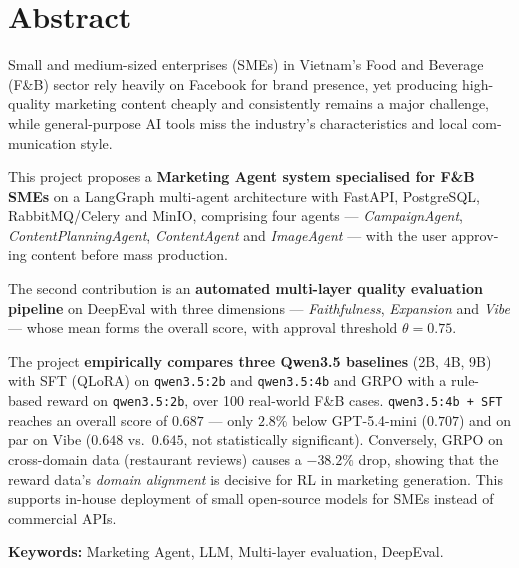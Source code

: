\cleardoublepage
{}
{}
\chapter*{Abstract}

\begin{otherlanguage}{english}

Small and medium-sized enterprises (SMEs) in Vietnam's Food and Beverage (F\&B) sector rely heavily on Facebook for brand presence, yet producing high-quality marketing content cheaply and consistently remains a major challenge, while general-purpose AI tools miss the industry's characteristics and local communication style.

This project proposes a \textbf{Marketing Agent system specialised for F\&B SMEs} on a LangGraph multi-agent architecture with FastAPI, PostgreSQL, RabbitMQ/Celery and MinIO, comprising four agents --- \textit{CampaignAgent}, \textit{ContentPlanningAgent}, \textit{ContentAgent} and \textit{ImageAgent} --- with the user approving content before mass production.

The second contribution is an \textbf{automated multi-layer quality evaluation pipeline} on DeepEval with three dimensions --- \textit{Faithfulness}, \textit{Expansion} and \textit{Vibe} --- whose mean forms the overall score, with approval threshold $\theta = 0.75$.

The project \textbf{empirically compares three Qwen3.5 baselines} (2B, 4B, 9B) with SFT (QLoRA) on \texttt{qwen3.5:2b} and \texttt{qwen3.5:4b} and GRPO with a rule-based reward on \texttt{qwen3.5:2b}, over 100 real-world F\&B cases. \texttt{qwen3.5:4b + SFT} reaches an overall score of $0.687$ --- only $2.8\%$ below GPT-5.4-mini ($0.707$) and on par on Vibe ($0.648$ vs.\ $0.645$, not statistically significant). Conversely, GRPO on cross-domain data (restaurant reviews) causes a $-38.2\%$ drop, showing that the reward data's \emph{domain alignment} is decisive for RL in marketing generation. This supports in-house deployment of small open-source models for SMEs instead of commercial APIs.

\vspace{0.4em}

\noindent\textbf{Keywords:} Marketing Agent, LLM, Multi-layer evaluation, DeepEval.

\end{otherlanguage}

\endgroup
